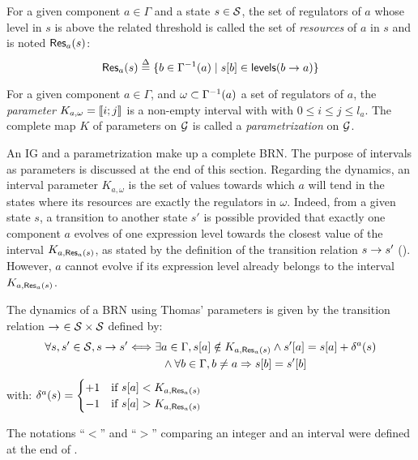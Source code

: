 \begin{definition}\label{def:resources}
For a given component $a \in \Gamma$ and a state $s \in \mathcal{S}$,
the set of regulators of $a$ whose level in $s$ is above the related threshold %
is called the set of \emph{resources} of $a$ in $s$ and is noted $\mathsf{Res}_{a}(s)$:
$$\mathsf{Res}_{a}(s) \stackrel{\Delta}= \{ b \in \Gamma^{-1}(a) \mid {s[b]} \in \mathsf{levels}(b\rightarrow a) \}$$
\end{definition}

\begin{definition}\label{def:param}
For a given component $a \in \Gamma$, and $\omega \subset \Gamma^{-1}(a)$ a set of regulators of $a$,
the \emph{parameter} $K_{a,\omega} = \llbracket i ; j \rrbracket$ is a non-empty interval with with $0 \leq i \leq j \leq l_a$.
The complete map $K$ of parameters on $\mathcal{G}$ is called a \emph{parametrization} on $\mathcal{G}$.
\end{definition}
An IG and a parametrization make up a complete BRN.
The purpose of intervals as parameters is discussed at the end of this section.
Regarding the dynamics, an interval parameter $K_{a,\omega}$ is the set of values towards which $a$ will tend
in the states where its resources are exactly the regulators in $\omega$.
Indeed, from a given state $s$, a transition to another state $s'$ is possible provided that
exactly one component $a$ evolves of one expression level towards the closest value of the interval $K_{a,\mathsf{Res}_{a}(s)}$,
as stated by the definition of the transition relation $s \rightarrow s'$ ().
However, $a$ cannot evolve if its expression level already belongs to the interval $K_{a,\mathsf{Res}_{a}(s)}$.

\begin{definition}\label{def:dynamics}
The dynamics of a BRN using Thomas' parameters is given by the transition relation $\rightarrow\ \in \mathcal{S} \times \mathcal{S}$ defined by:
\begin{align*}
  \forall s, s' \in \mathcal{S}, s \rightarrow s' &\Longleftrightarrow \exists a \in \Gamma,
  {s[a]} \notin K_{a, \mathsf{Res}_{a}(s)} \wedge {s'[a]} = {s[a]} + \delta^a(s) \\
    & \qquad\quad \wedge \forall b \in \Gamma, b \neq a \Rightarrow {s[b]} = {s'[b]}
\end{align*}
with: $\delta^a(s) = 
  \begin{cases}
    +1 & \text{if } {s[a]} < K_{a, \mathsf{Res}_{a}(s)} \\
    -1 & \text{if } {s[a]} > K_{a, \mathsf{Res}_{a}(s)} \\
  \end{cases}$
\end{definition}
The notations “$<$” and “$>$” comparing an integer and an interval were defined at the end of .

